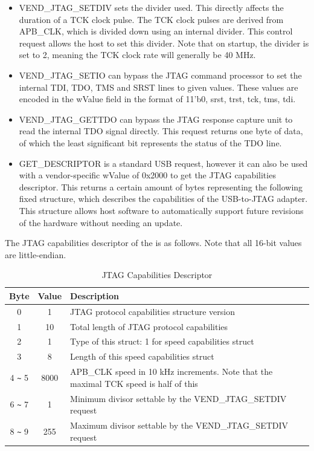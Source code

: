 \documentclass[main\_\_EN.tex]{subfiles}
\begin{document}
\begin{itemize}
\item VEND\_JTAG\_SETDIV sets the divider used. This directly affects the duration of a TCK clock pulse. The TCK clock pulses are derived from APB\_CLK, which is divided down using an internal divider. This control request allows the host to set this divider. Note that on startup, the divider is set to 2, meaning the TCK clock rate will generally be 40 MHz.

\item VEND\_JTAG\_SETIO can bypass the JTAG command processor to set the internal TDI, TDO, TMS and SRST lines to given values. These values are encoded in the wValue field in the format of {11'b0, srst, trst, tck, tms, tdi}.

\item VEND\_JTAG\_GETTDO can bypass the JTAG response capture unit to read the internal TDO signal directly. This request returns one byte of data, of which the least significant bit represents the status of the TDO line.

\item GET\_DESCRIPTOR is a standard USB request, however it can also be used with a vendor-specific wValue of 0x2000 to get the JTAG capabilities descriptor. This returns a certain amount of bytes representing the following fixed structure, which describes the capabilities of the USB-to-JTAG adapter. This structure allows host software to automatically support future revisions of the hardware without needing an update.
\end{itemize}


The JTAG capabilities descriptor of the \chipname{} is as follows. Note that all 16-bit values are little-endian.

\begin{table}[H]
    \centering
    \caption{JTAG Capabilities Descriptor}
    \label{tab:usbserialjtag-capabilities-descriptor}
    \begin{tabular}{ |c|c|l| } 
    \hline
        \rowcolor{lightgray}
        \textbf{Byte} & \textbf{Value} & \textbf{Description} \\\hline
        
        0 &    1 &     JTAG protocol capabilities structure version \\\hline
        1 &    10 &     Total length of JTAG protocol capabilities \\\hline
        2 &    1 &     Type of this struct: 1 for speed capabilities struct \\\hline
        3 &    8 &     Length of this speed capabilities struct \\\hline
        4 \verb+~+ 5 &  8000 &  APB\_CLK speed in 10 kHz increments. Note that the maximal TCK speed is half of this \\\hline
        6 \verb+~+ 7 &  1 &     Minimum divisor settable by the  VEND\_JTAG\_SETDIV request \\\hline
        8 \verb+~+ 9 &  255 &   Maximum divisor settable by the  VEND\_JTAG\_SETDIV request \\\hline
    \end{tabular}
\end{table}
\end{document}
